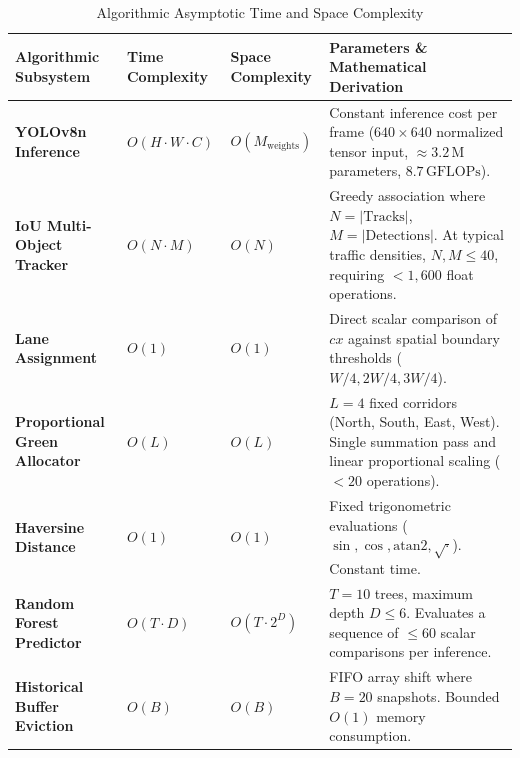 \documentclass[11pt,a4paper,oneside]{report}
\begin{document}
\begin{table}[h!]
\centering
\small
\begin{tabularx}{\textwidth}{p{3.5cm} p{2cm} p{2cm} X}
\toprule
\textbf{Algorithmic Subsystem} & \textbf{Time Complexity} & \textbf{Space Complexity} & \textbf{Parameters \& Mathematical Derivation} \\
\midrule
\textbf{YOLOv8n Inference} & $O(H \cdot W \cdot C)$ & $O(M_{\text{weights}})$ & Constant inference cost per frame ($640 \times 640$ normalized tensor input, $\approx 3.2\,\text{M}$ parameters, $8.7\,\text{GFLOPs}$). \\
\textbf{IoU Multi-Object Tracker} & $O(N \cdot M)$ & $O(N)$ & Greedy association where $N = |\text{Tracks}|$, $M = |\text{Detections}|$. At typical traffic densities, $N, M \le 40$, requiring $< 1,600$ float operations. \\
\textbf{Lane Assignment} & $O(1)$ & $O(1)$ & Direct scalar comparison of $cx$ against spatial boundary thresholds ($W/4, 2W/4, 3W/4$). \\
\textbf{Proportional Green Allocator} & $O(L)$ & $O(L)$ & $L = 4$ fixed corridors (North, South, East, West). Single summation pass and linear proportional scaling ($< 20$ operations). \\
\textbf{Haversine Distance} & $O(1)$ & $O(1)$ & Fixed trigonometric evaluations ($\sin, \cos, \text{atan2}, \sqrt{\cdot}$). Constant time. \\
\textbf{Random Forest Predictor} & $O(T \cdot D)$ & $O(T \cdot 2^D)$ & $T = 10$ trees, maximum depth $D \le 6$. Evaluates a sequence of $\le 60$ scalar comparisons per inference. \\
\textbf{Historical Buffer Eviction} & $O(B)$ & $O(B)$ & FIFO array shift where $B = 20$ snapshots. Bounded $O(1)$ memory consumption. \\
\bottomrule
\end{tabularx}
\caption{Algorithmic Asymptotic Time and Space Complexity}
\label{tab:complexity_table}
\end{table}
\end{document}
